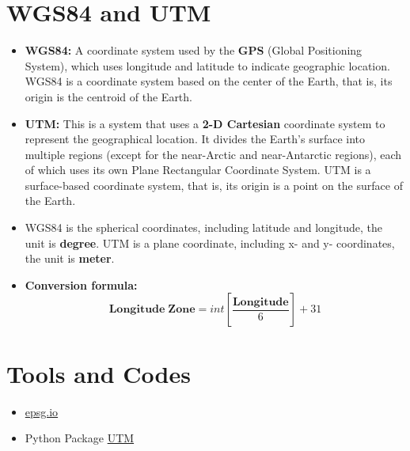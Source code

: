 \documentclass[10pt]{article}
\begin{document}
\section{\textbf{WGS84 and UTM}}	

\begin{itemize}
	\item \textbf{WGS84:} A coordinate system used by the \textbf{GPS} (Global Positioning System), which uses longitude and latitude to indicate geographic location. WGS84 is a coordinate system based on the center of the Earth, that is, its origin is the centroid of the Earth.
	
	\item \textbf{UTM:} This is a system that uses a \textbf{2-D Cartesian} coordinate system to represent the geographical location. It divides the Earth's surface into multiple regions (except for the near-Arctic and near-Antarctic regions), each of which uses its own Plane Rectangular Coordinate System. UTM is a surface-based coordinate system, that is, its origin is a point on the surface of the Earth. 
	
	\item WGS84 is the spherical coordinates, including latitude and longitude, the unit is \textbf{degree}. UTM is a plane coordinate, including x- and y- coordinates, the unit is \textbf{meter}.
	
	\item \textbf{Conversion formula:}  
	  \begin{equation*}
	  	  \bm{Longitude \; Zone} = int  \left [ \frac{\bm{Longitude}}{6} \right ]  + 31
	  \end{equation*}
	
\end{itemize}	


\section{\textbf{Tools and Codes}}	

\begin{itemize}
	\item \href{https://epsg.io/map#srs=4326&x=117.290039&y=31.952162&z=6&layer=streets}{epsg.io}
	
	\item Python Package \href{https://github.com/Turbo87/utm}{UTM}
	
\end{itemize}
\end{document}
